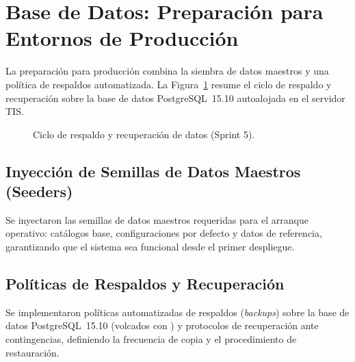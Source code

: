 \section{Base de Datos: Preparación para Entornos de Producción}
\label{sec:s5_database}

La preparación para producción combina la siembra de datos maestros y una política de respaldos
automatizada. La Figura~\ref{fig:s5_backup} resume el ciclo de respaldo y recuperación sobre
la base de datos PostgreSQL~15.10 autoalojada en el servidor TIS.\par

\begin{figure}[!ht]
    \centering
    \caption{Ciclo de respaldo y recuperación de datos (Sprint 5).}
    \label{fig:s5_backup}
\end{figure}

\subsection{Inyección de Semillas de Datos Maestros (Seeders)}
\label{ssec:s5_db_seeders}
Se inyectaron las semillas de datos maestros requeridas para el arranque operativo: catálogos
base, configuraciones por defecto y datos de referencia, garantizando que el sistema sea
funcional desde el primer despliegue.

\subsection{Políticas de Respaldos y Recuperación}
\label{ssec:s5_db_backups}
Se implementaron políticas automatizadas de respaldos (\textit{backups}) sobre la base de datos
PostgreSQL~15.10 (volcados con ) y protocolos de recuperación ante
contingencias, definiendo la frecuencia de copia y el procedimiento de restauración.

